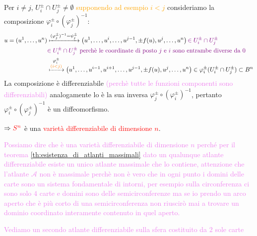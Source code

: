 \begin{esempio}
        Per $i \neq j$, $U_i^{\pm} \cap U_j^{\pm} \neq \emptyset$
        \textcolor{orange}{supponendo ad esempio $i < j$} consideriamo la 
        composizione $\varphi_i^{\pm} \circ (\varphi_j^{\pm})^{-1}$:
        \begin{align*}
        u = (u^1, \dots, u^n) &\xmapsto{(\varphi_j^{\pm})^{-1}=\psi^{\pm}_j} \left( u^1, \dots, u^i, \dots, u^{j-1}, \pm f(u), u^j, \dots, u^n \right) \textcolor{violet}{\in U_i^{\pm} \cap U_j^{\pm} } \\
        & \textcolor{violet}{\in U_i^{\pm} \cap U_j^{\pm} \text{ perchè le  coordinate di posto $j$ e $i$ sono entrambe diverse da $0$}} \\
        &\xmapsto{\substack{\varphi_i^{\pm} \\ \textcolor{orange}{(i<j)}}} \left( u^1, \dots, u^{i-1}, u^{i+1}, \dots, u^{j-1}, \pm f(u), u^j, \dots, u^n \right) \in \varphi_i^{\pm} (U_i^{\pm} \cap U_j^{\pm} ) \subset B^n
        \end{align*}
        La composizione è differenziabile \textcolor{violet}{(perchè tutte le funzioni componenti sono differenziabili)} 
        analogamente lo è la sua inversa $\varphi_j^{\pm} \circ (\varphi_i^{\pm})^{-1}$, pertanto $\varphi_i^{\pm} \circ (\varphi_j^{\pm})^{-1}$ è un diffeomorfismo.

        $\Rightarrow \textcolor{red}{S^n}$ è una \textcolor{red}{varietà differenziabile di dimensione $n$}.

        \textcolor{violet}{Possiamo dire che è una varietà differenziabile di dimensione $n$ perché per il teorema \ref{th:esistenza_di_atlanti_massimali} dato un qualunque atlante differenziabile 
        esiste un unico atlante massimale che lo contiene, attenzione che l'atlante $\mathcal{A}$ non è massimale perchè non è vero che in ogni punto i domini delle carte sono
        un sistema fondamentale di intorni, per esempio sulla circonferenza ci sono solo $4$ carte e domini sono delle semicirconferenze ma se io prendo un arco aperto
        che è più corto di una semicirconferenza non riuscirò mai a trovare un dominio coordinato interamente contenuto in quel aperto.}
        \end{esempio}
        \newpage
        \textcolor{violet}{Vediamo un secondo atlante differenziabile sulla sfera costituito da $2$ sole carte}
